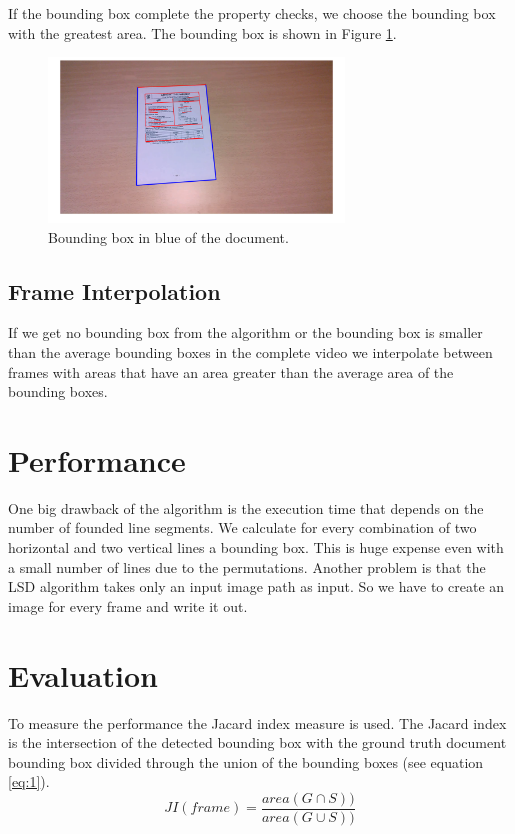 \documentclass[english, paper=a4]{scrartcl}
\begin{document}
If the bounding box complete the property checks, we choose the bounding box with the greatest area. 
The bounding box is shown in Figure \ref{fig:bb}.
\begin{figure}[h]
\centering
\includegraphics[width=0.7\textwidth]{bb.png}
\caption{Bounding box in blue of the document.}
\label{fig:bb}
\end{figure}

\subsection{Frame Interpolation}
If we get no bounding box from the algorithm or the bounding box is smaller than the average bounding boxes in the complete video we interpolate between frames with areas that have an area greater than the average area of the bounding boxes.

\section{Performance}
One big drawback of the algorithm is the execution time that depends on the number of founded line segments. We calculate for every combination of two horizontal and two vertical lines a bounding box. This is huge expense even with a small number of lines due to the permutations. Another problem is that the LSD algorithm takes only an input image path as input. So we have to create an image for every frame and write it out.

\section{Evaluation}
To measure the performance the Jacard index measure \cite{everingham2010pascal} is used. 
The Jacard index is the intersection of the detected bounding box with the ground truth document bounding box divided through the union of the bounding boxes (see equation \ref{eq:1}).
\begin{equation}\label{eq:1}
JI(frame)= \frac{area(G\cap S))}{area(G\cup S))}
\end{equation}
\end{document}

